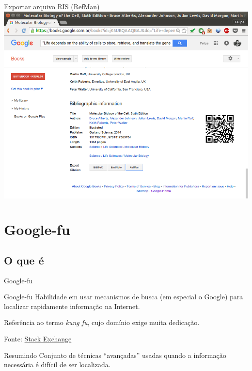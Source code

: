 \documentclass{beamer}
\begin{document}
\begin{frame}{Exportar arquivo RIS (RefMan)}
  \centering
  \includegraphics[height=.85\textheight]{Busca/gbooks-about2}
\end{frame}

\section{Google-fu}

\subsection{O que é}

\begin{frame}{Google-fu}
  \begin{block}{Google-fu}
    \footnotesize
    Habilidade em usar mecanismos de busca (em especial o Google) para
    localizar rapidamente informação na Internet.

    \bigskip
    Referência ao termo {\em kung fu}, cujo domínio exige muita
    dedicação.

    \bigskip
  \hfill {\tiny Fonte: \href{http://english.stackexchange.com/questions/19967/what-does-google-fu-mean}{Stack Exchange}}
  \end{block}

  \bigskip
  \begin{block}{Resumindo}
    \footnotesize
    Conjunto de técnicas ``avançadas'' usadas quando a informação
    necessária é difícil de ser localizada.
  \end{block}
\end{frame}
\end{document}
